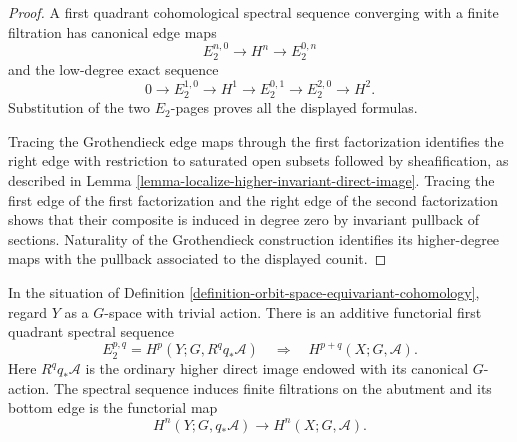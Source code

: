 \begin{proof}
A first quadrant cohomological spectral sequence converging with a finite
filtration has canonical edge maps
$$
E_2^{n, 0} \longrightarrow H^n \longrightarrow E_2^{0, n}
$$
and the low-degree exact sequence
$$
0 \longrightarrow E_2^{1, 0} \longrightarrow H^1
\longrightarrow E_2^{0, 1} \longrightarrow E_2^{2, 0}
\longrightarrow H^2.
$$
Substitution of the two $E_2$-pages proves all the displayed formulas.

Tracing the Grothendieck edge maps through the first factorization identifies
the right edge with restriction to saturated open subsets followed by
sheafification, as described in Lemma
\ref{lemma-localize-higher-invariant-direct-image}. Tracing the first edge
of the first factorization and the right edge of the second factorization
shows that their composite is induced in degree zero by invariant pullback
of sections. Naturality of the Grothendieck construction identifies its
higher-degree maps with the pullback associated to the displayed counit.
\end{proof}

\begin{lemma}
\label{lemma-orbit-space-equivariant-third-spectral-sequence}
\begin{reference}
\cite[Chapter V, \S 5.2, (5.2.10), p. 201]{Tohoku}
\end{reference}
In the situation of Definition
\ref{definition-orbit-space-equivariant-cohomology}, regard $Y$ as a
$G$-space with trivial action. There is an additive functorial first quadrant
spectral sequence
$$
E_2^{p,q} = H^p(Y;G,R^qq_*\mathcal{A})
\quad\Longrightarrow\quad
H^{p+q}(X;G,\mathcal{A}).
$$
Here $R^qq_*\mathcal{A}$ is the ordinary higher direct image endowed with its
canonical $G$-action. The spectral sequence induces finite filtrations on the
abutment and its bottom edge is the functorial map
$$
H^n(Y;G,q_*\mathcal{A})
\longrightarrow
H^n(X;G,\mathcal{A}).
$$
\end{lemma}

